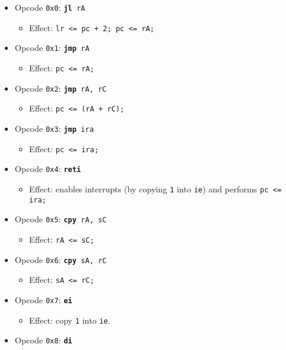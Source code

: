 \documentclass{article}
\begin{document}
	\singlespacing
	\begin{itemize}
		\item Opcode \texttt{0x0}:
			\texttt{\textbf{jl} rA}
		\begin{itemize}
			\item Effect:  \texttt{lr <= pc + 2; pc <= rA;}
		\end{itemize}
		\item Opcode \texttt{0x1}:
			\texttt{\textbf{jmp} rA}
		\begin{itemize}
			\item Effect:  \texttt{pc <= rA;}
		\end{itemize}
		\item Opcode \texttt{0x2}:
			\texttt{\textbf{jmp} rA, rC}
		\begin{itemize}
			\item Effect:  \texttt{pc <= (rA + rC);}
		\end{itemize}
		\item Opcode \texttt{0x3}:
			\texttt{\textbf{jmp} ira}
		\begin{itemize}
			\item Effect:  \texttt{pc <= ira;}
		\end{itemize}
		\item Opcode \texttt{0x4}:
			\texttt{\textbf{reti}}
		\begin{itemize}
			\item Effect:  enables interrupts (by copying \texttt{1} into
			\texttt{ie}) and performs \texttt{pc <= ira;}
		\end{itemize}
		\item Opcode \texttt{0x5}:
			\texttt{\textbf{cpy} rA, sC}
		\begin{itemize}
			\item Effect:  \texttt{rA <= sC;}
		\end{itemize}
		\item Opcode \texttt{0x6}:
			\texttt{\textbf{cpy} sA, rC}
		\begin{itemize}
			\item Effect:  \texttt{sA <= rC;}
		\end{itemize}
		\item Opcode \texttt{0x7}:
			\texttt{\textbf{ei}}
		\begin{itemize}
			\item Effect:  copy \texttt{1} into \texttt{ie}.
		\end{itemize}
		\item Opcode \texttt{0x8}:
			\texttt{\textbf{di}}
		\begin{itemize}

\end{itemize}
\end{itemize}
\end{document}
